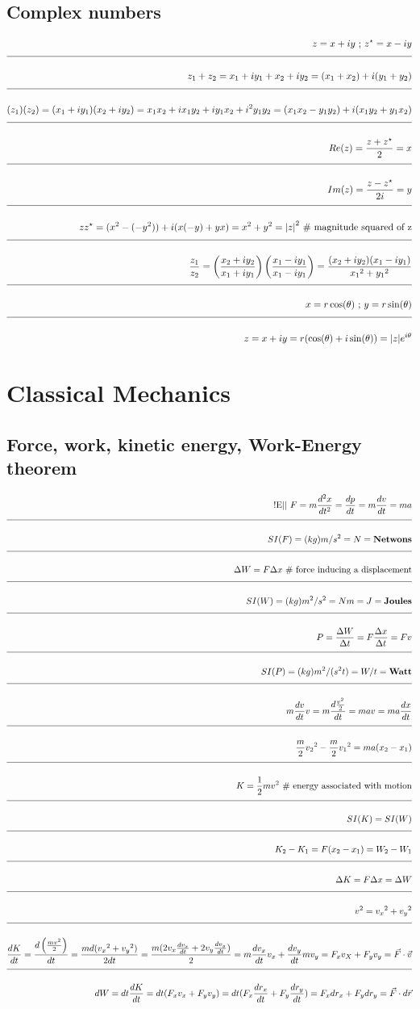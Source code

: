 \documentclass[a4paper]{article}
\newcommand{\eqComment}[1]{\text{  \# #1}}
\newcommand{\eqSep}{\text{ ;  }}
\newcommand{\experimental}{\text{!E||  }}
\newcommand{\n}{\\[1.5ex] \hline \nonumber \\[0ex]}
\begin{document}
\subsection{Complex numbers}
\begin{tcolorbox}
\begin{align}
   z = x + i y \eqSep z^\star = x - i y
\n z_1 + z_2 = x_1 + i y_1 + x_2 + i y_2 = (x_1 + x_2) + i (y_1 + y_2)
\n (z_1) (z_2) =  (x_1 + i y_1) (x_2 + i y_2) = x_1 x_2 + i x_1 y_2 + i y_1 x_2 + i^2 y_1 y_2 = (x_1 x_2 - y_1 y_2) + i (x_1 y_2 + y_1 x_2)
\n Re(z) = \frac{z + z^\star}{2} = x
\n Im(z) = \frac{z - z^\star}{2 i} = y
\n z z^\star = (x^2 - (-y^2)) + i (x (-y) + y x) = x^2 + y^2 = {|z|}^2 \eqComment{magnitude squared of z}
\n \frac{z_1}{z_2} = \left(\frac{x_2 + i y_2}{x_1 + i y_1}\right) \left(\frac{x_1 - i y_1}{x_1 - i y_1}\right) = \frac{(x_2 + i y_2) (x_1 - i y_1)}{{x_1}^2 + {y_1}^2}
\n x = r \cos(\theta) \eqSep y = r \sin(\theta)
\n z = x + i y = r (\cos(\theta) + i \sin(\theta)) = |z| e^{i \theta}
\end{align}
\end{tcolorbox}

\section{Classical Mechanics}
\subsection{Force, work, kinetic energy, Work-Energy theorem}
\begin{tcolorbox}
\begin{align}
   \experimental F = m \frac{d^2x}{dt^2} = \frac{dp}{dt} = m \frac{dv}{dt} = m a
\n SI(F) = (kg) m / s^2 = N = \textbf{Netwons}
\n \Delta W = F \Delta x \eqComment{force inducing a displacement}
\n SI(W) = (kg) m^2 / s^2 = N m = J = \textbf{Joules}
\n P = \frac{\Delta W}{\Delta t} = F \frac{\Delta x}{\Delta t} = F v
\n SI(P) = (kg) m^2 / (s^2 t) = W / t = \textbf{Watt}
\n m \frac{dv}{dt} v = m \frac{d \frac{v^2}{2}}{dt} = m a v = m a \frac{dx}{dt}
\n  \frac{m}{2} {v_2}^2 - \frac{m}{2} {v_1}^2 = m a (x_2 - x_1)
\n K = \frac{1}{2} m v^2 \eqComment{energy associated with motion}
\n SI(K) = SI(W)
\n K_2 - K_1 = F (x_2 - x_1) = W_2 - W_1
\n \Delta K = F \Delta x = \Delta W
\n v^2 = {v_x}^2 + {v_y}^2
\n \frac{dK}{dt} = \frac{d\left(\frac{m v^2}{2}\right)}{dt} = \frac{m d({v_x}^2 + {v_y}^2)}{2 dt} = \frac{m (2 v_x \frac{dv_x}{dt}+ 2 v_y \frac{dv_y}{dt})}{2} = m \frac{dv_x}{dt} v_x + \frac{dv_y}{dt} m v_y = F_x v_X + F_y v_y = \vec{F} \cdot \vec{v}
\n dW = dt \frac{dK}{dt} = dt (F_x v_x + F_y v_y) = dt (F_x \frac{dr_x}{dt} + F_y \frac{dr_y}{dt}) = F_x dr_x + F_y dr_y = \vec{F} \cdot d\vec{r}
\end{align}
\end{tcolorbox}
\end{document}
